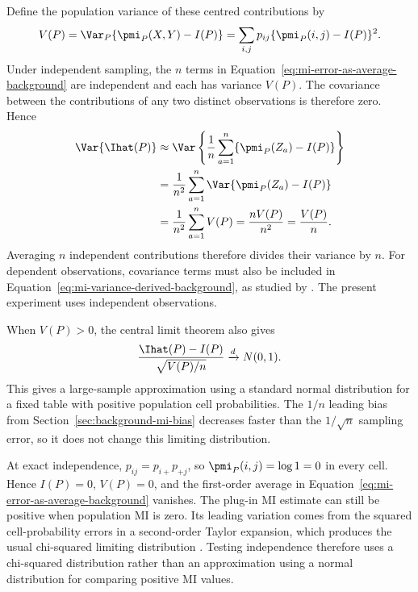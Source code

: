 \medskip
{}

Define the population variance of these centred contributions by
\begin{equation}
  V(P)
  =\Var_P\{\pmi_P(X,Y)-I(P)\}
  =\sum_{i,j}p_{ij}\{\pmi_P(i,j)-I(P)\}^2.
  \label{eq:mi-variance-background}
\end{equation}
Under independent sampling, the \(n\) terms in
Equation~\eqref{eq:mi-error-as-average-background} are independent and each
has variance \(V(P)\). The covariance between the contributions of any two
distinct observations is therefore zero. Hence
\begin{align}
  \Var\{\Ihat(P)\}
  &\approx
  \Var\left\{
    \frac{1}{n}\sum_{a=1}^{n}
    \{\pmi_P(Z_a)-I(P)\}
  \right\}
  \notag\\
  &=\frac{1}{n^2}
    \sum_{a=1}^{n}\Var\{\pmi_P(Z_a)-I(P)\}
  \notag\\
  &=\frac{1}{n^2}\sum_{a=1}^{n}V(P)
  =\frac{nV(P)}{n^2}
  =\frac{V(P)}{n}.
  \label{eq:mi-variance-derived-background}
\end{align}
Averaging \(n\) independent contributions therefore divides their variance
by \(n\). For dependent observations, covariance terms must also be included
in Equation~\eqref{eq:mi-variance-derived-background}, as studied by
\citet{moddemeijer1999}. The present experiment uses independent observations.

When \(V(P)>0\), the central limit theorem also gives
\begin{equation}
  \frac{\Ihat(P)-I(P)}{\sqrt{V(P)/n}}
  \xrightarrow{d}N(0,1).
  \label{eq:mi-clt-background}
\end{equation}
This gives a large-sample approximation using a standard normal distribution
for a fixed table with positive population cell probabilities. The \(1/n\)
leading bias from Section~\ref{sec:background-mi-bias} decreases faster than the
\(1/\sqrt n\) sampling error, so it does not change this limiting
distribution.

\medskip
{}
\nopagebreak[4]

At exact independence, \(p_{ij}=p_{i+}p_{+j}\), so
\(\pmi_P(i,j)=\log 1=0\) in every cell. Hence \(I(P)=0\), \(V(P)=0\), and the
first-order average in Equation~\eqref{eq:mi-error-as-average-background}
vanishes.
The plug-in MI estimate can still be positive when population MI is zero.
Its leading variation comes from
the squared cell-probability errors in a second-order Taylor expansion, which
produces the usual chi-squared limiting distribution
\citep{brillinger2004,marinescu2025}. Testing independence therefore uses a
chi-squared distribution rather than an approximation using a normal
distribution for comparing positive MI values.

